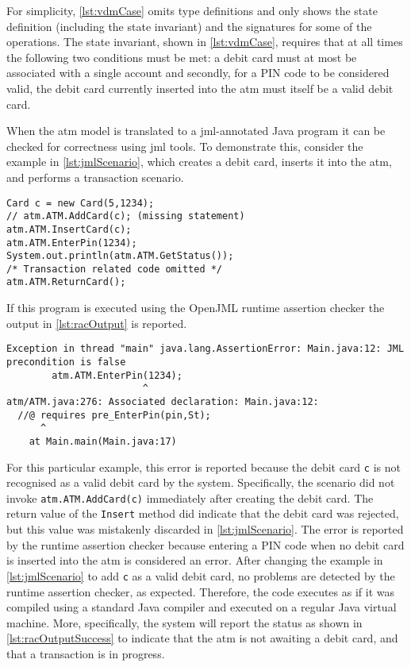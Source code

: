 For simplicity, \autoref{lst:vdmCase} omits type definitions and only
shows the state definition (including the state invariant) and the
signatures for some of the operations. The state invariant, shown in
\autoref{lst:vdmCase}, requires that at all times the following two
conditions must be met: a debit card must at most be associated with a
single account and secondly, for a PIN code to be considered valid,
the debit card currently inserted into the \ac{atm} must itself be a
valid debit card.

When the \ac{atm} model is translated to a \ac{jml}-annotated Java
program it can be checked for correctness using \ac{jml} tools. To
demonstrate this, consider the example in \autoref{lst:jmlScenario},
which creates a debit card, inserts it into the \ac{atm}, and performs
a transaction scenario.

\begin{lstlisting}[style=customJml,caption={Java code demonstrating
use of the implementation of the \ac{atm}
model.},label={lst:jmlScenario}]
Card c = new Card(5,1234);
// atm.ATM.AddCard(c); (missing statement)
atm.ATM.InsertCard(c);
atm.ATM.EnterPin(1234);
System.out.println(atm.ATM.GetStatus());
/* Transaction related code omitted */
atm.ATM.ReturnCard();
\end{lstlisting}

If this program is executed using the OpenJML runtime assertion
checker the output in \autoref{lst:racOutput} is reported.

\begin{lstlisting}[style=racOutput,caption={Inconsistent use of the
system detected using the OpenJML runtime assertion
checker.},label={lst:racOutput}]
Exception in thread "main" java.lang.AssertionError: Main.java:12: JML precondition is false
        atm.ATM.EnterPin(1234);
                        ^
atm/ATM.java:276: Associated declaration: Main.java:12: 
  //@ requires pre_EnterPin(pin,St);
      ^
	at Main.main(Main.java:17)
\end{lstlisting}

For this particular example, this error is reported because the debit
card \texttt{c} is not recognised as a valid debit card by the
system. Specifically, the scenario did not invoke
\texttt{atm.ATM.AddCard(c)} immediately after creating the debit
card. The return value of the \texttt{Insert} method did indicate that
the debit card was rejected, but this value was mistakenly discarded
in \autoref{lst:jmlScenario}. The error is reported by the runtime
assertion checker because entering a PIN code when no debit card is
inserted into the \ac{atm} is considered an error. After changing the
example in \autoref{lst:jmlScenario} to add \texttt{c} as a valid
debit card, no problems are detected by the runtime assertion checker,
as expected. Therefore, the code executes as if it was compiled using
a standard Java compiler and executed on a regular Java virtual
machine. More, specifically, the system will report the status as
shown in \autoref{lst:racOutputSuccess} to indicate that the \ac{atm}
is not awaiting a debit card, and that a transaction is in progress.

